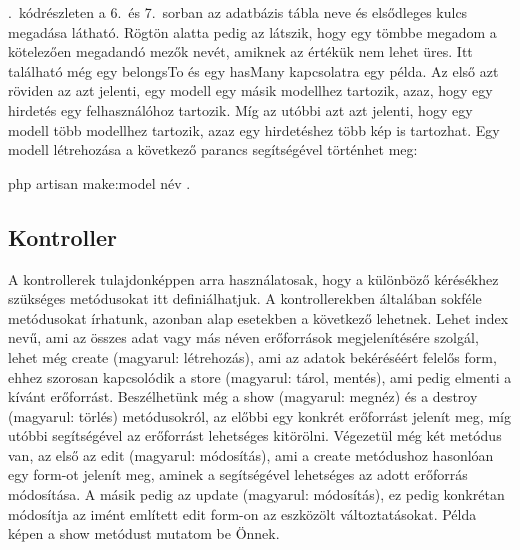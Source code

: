 \documentclass[]{thesis-ekf}
\theoremstyle{definition}
\theoremstyle{remark}
\begin{document}
		
		
		.~kódrészleten a 6.~és 7.~sorban az adatbázis tábla neve és elsődleges kulcs megadása látható. Rögtön alatta pedig az látszik, hogy egy tömbbe megadom a kötelezően megadandó mezők nevét, amiknek az értékük nem lehet üres. Itt található még egy belongsTo és egy hasMany kapcsolatra egy példa. Az első azt röviden az azt jelenti, egy modell egy másik modellhez tartozik, azaz, hogy egy hirdetés egy felhasználóhoz tartozik. Míg az utóbbi azt azt jelenti, hogy egy modell több modellhez tartozik, azaz egy hirdetéshez több kép is tartozhat. Egy modell létrehozása a következő parancs segítségével történhet meg:
		\begin{center} 
			php artisan make:model név .
		\end{center}
	
	\subsection{Kontroller}\label{sc-kontroller}
		A kontrollerek tulajdonképpen arra használatosak, hogy a különböző kérésékhez szükséges metódusokat itt definiálhatjuk. A kontrollerekben általában sokféle metódusokat írhatunk, azonban alap esetekben a következő lehetnek. Lehet index nevű, ami az összes adat vagy más néven erőforrások megjelenítésére szolgál, lehet még create (magyarul: létrehozás), ami az adatok bekéréséért felelős form, ehhez szorosan kapcsolódik a store (magyarul: tárol, mentés), ami pedig elmenti a kívánt erőforrást. Beszélhetünk még a show (magyarul: megnéz) és a destroy (magyarul: törlés) metódusokról, az előbbi egy konkrét erőforrást jelenít meg, míg utóbbi segítségével az erőforrást lehetséges kitörölni. Végezetül még két metódus van, az első az edit (magyarul: módosítás), ami a create metódushoz hasonlóan egy form-ot jelenít meg, aminek a segítségével lehetséges az adott erőforrás módosítása. A másik pedig az update (magyarul: módosítás), ez pedig konkrétan módosítja az imént említett edit form-on az eszközölt változtatásokat. Példa képen a show metódust mutatom be Önnek. \cite{Laravel}
	
		
	
\end{document}
